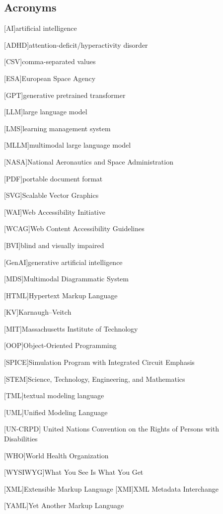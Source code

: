 \subsection*{Acronyms} 
\begin{acronym}[WYSIWYG]



[AI]{artificial intelligence}

[ADHD]{attention-deficit/hyperactivity disorder}

[CSV]{comma-separated values}

[ESA]{European Space Agency}

[GPT]{generative pretrained transformer}

[LLM]{large language model}

[LMS]{learning management system}

[MLLM]{multimodal large language model}

[NASA]{National Aeronautics and Space Administration}

[PDF]{portable document format}

[SVG]{Scalable Vector Graphics}

[WAI]{Web Accessibility Initiative}

[WCAG]{Web Content Accessibility Guidelines}

[BVI]{blind and visually impaired }


[GenAI]{generative artificial intelligence}

[MDS]{Multimodal Diagrammatic System }

[HTML]{Hypertext Markup Language}


[KV]{Karnaugh–Veitch}

[MIT]{Massachusetts Institute of Technology}

[OOP]{Object-Oriented Programming}

[SPICE]{Simulation Program with Integrated Circuit Emphasis}

[STEM]{Science, Technology, Engineering, and Mathematics}


[TML]{textual modeling language}

[UML]{Unified Modeling Language}

[UN-CRPD]{
United Nations Convention on the Rights of Persons with Disabilities}



[WHO]{World Health Organization}

[WYSIWYG]{What You See Is What You Get}

[XML]{Extensible Markup Language}
[XMI]{XML Metadata Interchange}

[YAML]{Yet Another Markup Language}

\end{acronym}